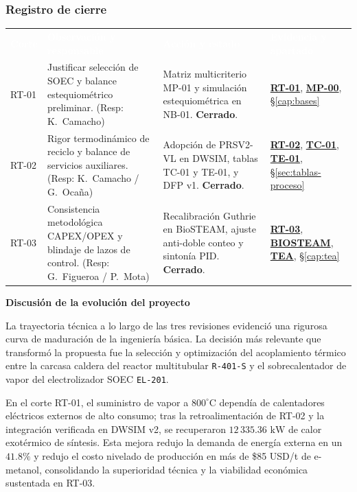 \documentclass[11pt,letterpaper]{article}
\newcommand{\Guia}[2]{%
  \begin{tcolorbox}[colback=Arena,colframe=Terracota,boxrule=0.35pt,
    leftrule=2pt,arc=0pt,left=7pt,right=7pt,
    top=4pt,bottom=4pt,before skip=5pt,after skip=5pt]
    {\sffamily\small\bfseries\color{Grafito}#1}\par #2
  \end{tcolorbox}}
\newcommand{\EncTabla}[1]{\textcolor{white}{\sffamily\small\bfseries #1}}
\newcommand{\CabeceraTabla}{\rowcolor{Grafito}}
\newcommand{\Ficha}[1]{\hyperlink{ev:#1}{\textsf{\textbf{#1}}}}
\begin{document}
\subsubsection*{Registro de cierre}
\begin{tabularx}{\linewidth}{@{}p{.105\linewidth}Y Y Y@{}}
\CabeceraTabla \EncTabla{Corte} & \EncTabla{Observación y responsable} &
\EncTabla{Acción y estado} & \EncTabla{Evidencia y apartado}\\
RT-01 & Justificar selección de SOEC y balance estequiométrico preliminar. (Resp: K.~Camacho) & Matriz multicriterio MP-01 y simulación estequiométrica en NB-01. \textbf{Cerrado}. & \Ficha{RT-01}, \Ficha{MP-00}, §\ref{cap:bases}\\
RT-02 & Rigor termodinámico de reciclo y balance de servicios auxiliares. (Resp: K.~Camacho / G.~Ocaña) & Adopción de PRSV2-VL en DWSIM, tablas TC-01 y TE-01, y DFP v1. \textbf{Cerrado}. & \Ficha{RT-02}, \Ficha{TC-01}, \Ficha{TE-01}, §\ref{sec:tablas-proceso}\\
RT-03 & Consistencia metodológica CAPEX/OPEX y blindaje de lazos de control. (Resp: G.~Figueroa / P.~Mota) & Recalibración Guthrie en BioSTEAM, ajuste anti-doble conteo y sintonía PID. \textbf{Cerrado}. & \Ficha{RT-03}, \Ficha{BIOSTEAM}, \Ficha{TEA}, §\ref{cap:tea}\\
\bottomrule
\end{tabularx}
\Guia{Discusión de la evolución del proyecto}{%
  La trayectoria técnica a lo largo de las tres revisiones evidenció una rigurosa curva de maduración de la ingeniería básica. La decisión más relevante que transformó la propuesta fue la selección y optimización del acoplamiento térmico entre la carcasa caldera del reactor multitubular \texttt{R-401-S} y el sobrecalentador de vapor del electrolizador SOEC \texttt{EL-201}.
  
  En el corte RT-01, el suministro de vapor a $800^\circ\mbox{C}$ dependía de calentadores eléctricos externos de alto consumo; tras la retroalimentación de RT-02 y la integración verificada en DWSIM v2, se recuperaron $12\,335.36\mbox{ kW}$ de calor exotérmico de síntesis. Esta mejora redujo la demanda de energía externa en un $41.8\%$ y redujo el costo nivelado de producción en más de \$85 USD/t de e-metanol, consolidando la superioridad técnica y la viabilidad económica sustentada en RT-03.}
\end{document}
